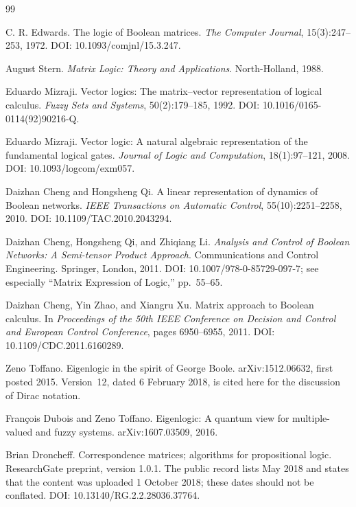 \documentclass[11pt]{article}
\theoremstyle{definition}
\theoremstyle{remark}
\begin{document}
\begin{thebibliography}{99}

C. R. Edwards.
\newblock The logic of Boolean matrices.
\newblock \emph{The Computer Journal}, 15(3):247--253, 1972.
\newblock DOI: 10.1093/comjnl/15.3.247.

August Stern.
\newblock \emph{Matrix Logic: Theory and Applications}.
\newblock North-Holland, 1988.

Eduardo Mizraji.
\newblock Vector logics: The matrix--vector representation of logical calculus.
\newblock \emph{Fuzzy Sets and Systems}, 50(2):179--185, 1992.
\newblock DOI: 10.1016/0165-0114(92)90216-Q.

Eduardo Mizraji.
\newblock Vector logic: A natural algebraic representation of the fundamental logical gates.
\newblock \emph{Journal of Logic and Computation}, 18(1):97--121, 2008.
\newblock DOI: 10.1093/logcom/exm057.

Daizhan Cheng and Hongsheng Qi.
\newblock A linear representation of dynamics of Boolean networks.
\newblock \emph{IEEE Transactions on Automatic Control}, 55(10):2251--2258, 2010.
\newblock DOI: 10.1109/TAC.2010.2043294.

Daizhan Cheng, Hongsheng Qi, and Zhiqiang Li.
\newblock \emph{Analysis and Control of Boolean Networks: A Semi-tensor Product Approach}.
\newblock Communications and Control Engineering. Springer, London, 2011.
\newblock DOI: 10.1007/978-0-85729-097-7; see especially ``Matrix Expression of Logic,'' pp.~55--65.

Daizhan Cheng, Yin Zhao, and Xiangru Xu.
\newblock Matrix approach to Boolean calculus.
\newblock In \emph{Proceedings of the 50th IEEE Conference on Decision and Control and European Control Conference}, pages 6950--6955, 2011.
\newblock DOI: 10.1109/CDC.2011.6160289.

Zeno Toffano.
\newblock Eigenlogic in the spirit of George Boole.
\newblock arXiv:1512.06632, first posted 2015.  Version~12, dated 6 February 2018, is cited here for the discussion of Dirac notation.

Fran\c{c}ois Dubois and Zeno Toffano.
\newblock Eigenlogic: A quantum view for multiple-valued and fuzzy systems.
\newblock arXiv:1607.03509, 2016.

Brian Droncheff.
\newblock Correspondence matrices; algorithms for propositional logic.
\newblock ResearchGate preprint, version 1.0.1.  The public record lists May 2018 and states that the content was uploaded 1 October 2018; these dates should not be conflated.
\newblock DOI: 10.13140/RG.2.2.28036.37764.


\end{thebibliography}
\end{document}
